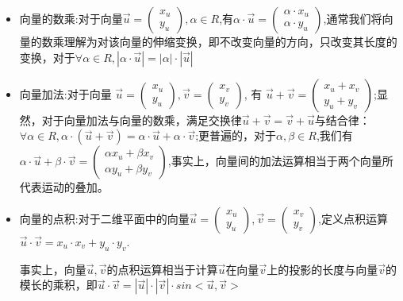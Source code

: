 \documentclass[UTF8]{article}
\begin{document}
\begin{itemize}
	\item 向量的数乘:对于向量$\vec{u} = \left(
\begin{array}{l}
x_u\\
y_u
\end{array}
\right), \alpha \in R$,有$\alpha\cdot\vec{u} = \left(
\begin{array}{l}
\alpha\cdot x_u\\
\alpha\cdot y_u
\end{array}
\right)$,通常我们将向量的数乘理解为对该向量的伸缩变换，即不改变向量的方向，只改变其长度的变换，对于$\forall \alpha\in R, |\alpha\cdot \vec{u}| = |\alpha|\cdot |\vec{u}|$

	\item 向量加法:对于向量
$\vec{u}= 
\left(
\begin{array}{l}
x_u\\
y_u
\end{array}
\right), 
\vec{v}= 
\left(
\begin{array}{l}
x_v\\
y_v
\end{array}
\right)$, 有
$\vec{u} + \vec{v} = 
\left(
\begin{array}{l}
x_u + x_v\\
y_u + y_v
\end{array}
\right)$;显然，对于向量加法与向量的数乘，满足交换律$\vec{u} + \vec{v} = \vec{v} + \vec{u}$与结合律：$\forall \alpha \in R, \alpha \cdot (\vec{u}+ \vec{v}) = \alpha\cdot\vec{u} + \alpha\cdot\vec{v}$;更普遍的，对于$\alpha, \beta \in R$,我们有$\alpha \cdot \vec{u} + \beta \cdot \vec{v} = 
\left(
\begin{array}{l}
\alpha x_u + \beta x_v\\
\alpha y_u + \beta y_v
\end{array}
\right)$,事实上，向量间的加法运算相当于两个向量所代表运动的叠加。

	\item 向量的点积:对于二维平面中的向量$\vec{u} = \left(
\begin{array}{l}
x_u\\
y_u
\end{array}
\right), \vec{v} = \left(
\begin{array}{l}
x_v\\
y_v
\end{array}
\right)$,定义点积运算$\vec{u}\cdot\vec{v} = x_u\cdot x_v + y_u\cdot y_v$.

事实上，向量$\vec{u}, \vec{v}$的点积运算相当于计算$\vec{u}$在向量$\vec{v}$上的投影的长度与向量$\vec{v}$的模长的乘积，即$\vec{u}\cdot\vec{v} = |\vec{u}|\cdot|\vec{v}|\cdot sin<\vec{u}, \vec{v}>$
\end{itemize}
\end{document}
